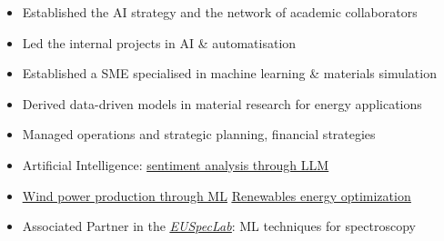 \documentclass[10pt,a4paper,ragged2e,withhyper]{altacv}
\begin{document}
\begin{paracol}{2}



\begin{itemize}
\item Established the AI strategy and the network of academic collaborators
\item Led the internal projects in AI \& automatisation
\end{itemize}
\divider

\begin{itemize}
\item Established a SME specialised in machine learning \& materials simulation
\item Derived data-driven models in material research for energy applications
\item Managed operations and strategic planning, financial strategies
\item Artificial Intelligence: \href{https://github.com/marcodigennaro/LLM}{\underline{sentiment analysis through LLM}}
\item[] \href{https://github.com/marcodigennaro/windml}{\underline{Wind power production through ML}} 
\href{https://github.com/marcodigennaro/optimization}{\underline{Renewables energy optimization}} 
\item Associated Partner in the  \href{https://euspeclab.cnrs.fr/}{\underline{\emph{EUSpecLab}}}: ML techniques for  spectroscopy
\end{itemize}
\divider


\end{paracol}
\end{document}
